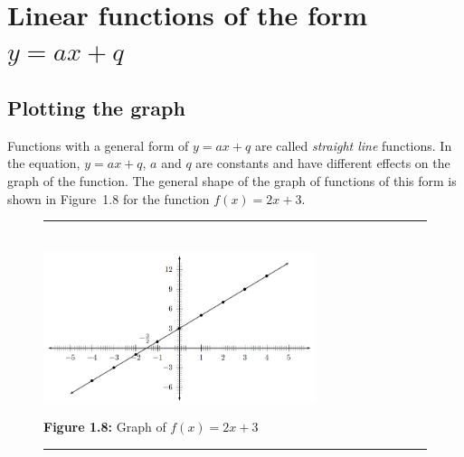 % 
%     
%     
%     
%     
\label{m39338*uid68}
\section{ Linear functions of the form $y=ax+q$}
\nopagebreak
\subsection*{Plotting the graph}       
\label{m39338*id237465}Functions with a general form of $y=ax+q$ are called \textsl{straight line} functions. In the equation, $y=ax+q$, $a$ and $q$ are constants and have different effects on the graph of the function. The general shape of the graph of functions of this form is shown in Figure~1.8 for the function $f\left(x\right)=2x+3$.\par 
\setcounter{subfigure}{0}
\begin{figure}[H] %
\begin{center}
\rule[.1in]{\figurerulewidth}{.005in} \\
\label{m39338*uid69!!!underscore!!!media}\label{m39338*uid69!!!underscore!!!printimage}\includegraphics[width=300px]{col11306.imgs/m39338_MG10C11_005.png} %
\vspace{2pt}
\vspace{\rubberspace}\par \begin{cnxcaption}
\small \textbf{Figure 1.8: }Graph of $f\left(x\right)=2x+3$
\end{cnxcaption}
\vspace{.1in}
\rule[.1in]{\figurerulewidth}{.005in} \\
\end{center}
\end{figure}       
\label{m39338*secfhsst!!!underscore!!!id833}
